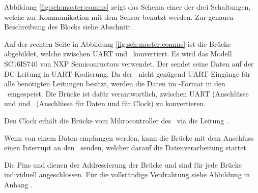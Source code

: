 
Abbildung  \ref{fig:sch:master:comms}   zeigt  das   Schema  einer   der  drei
Schaltungen,  welche  zur Kommunikation  mit  dem  Sensor benutzt  werden. Zur
genauen  Beschreibung  des   Blocks    siehe  Abschnitt
.

Auf der rechten Seite in Abbildung \ref{fig:sch:master:comms} ist die Br\"ucke
 abgebildet,  welche zwischen UART und  \ISC~konvertiert. Es wird das
Modell  SC16IS740 von  NXP Semiconructors  \cite{datasheet:uarti2c} verwendet.
Der \Sensor  sendet seine Daten  auf der DC-Leitung in  UART-Kodierung. Da der
\Raspi~nicht  gen\"ugend  UART-Eing\"ange  f\"ur alle  ben\"otigten  Leitungen
besitzt,  werden  die  Daten  im \ISC-Format  in  den  \Raspi~eingespeist. Die
Br\"ucke   ist  daf\"ur verantwortlich,  zwischen UART  (Anschl\"usse
  und   und  \ISC~(Anschl\"usse   f\"ur Daten  und
 f\"ur Clock) zu konvertieren.

Den Clock erh\"alt die Br\"ucke vom Mikrocontroller des \Raspi~via die Leitung
.

Wenn  von einem  \Sensor Daten  empfangen werden,  kann die  Br\"ucke mit  dem
Anschluss  einen Interrupt an den \Raspi~senden, welcher darauf die
Datenverarbeitung startet.

Die Pins   und   dienen der  Addressierung der  Br\"ucke und
sind f\"ur  jede Br\"ucke individuell angeschlossen. F\"ur  die vollst\"andige
Verdrahtung siehe Abbildung  in Anhang .

